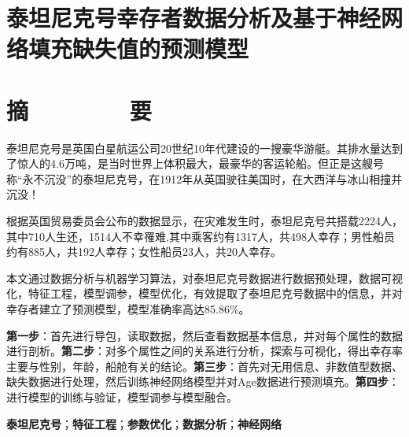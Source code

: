 \section*{\heiti 泰坦尼克号幸存者数据分析及基于神经网络填充缺失值的预测模型}
\section*{\heiti 摘\ \ \ \ \ \ \ \ 要}

泰坦尼克号是英国白星航运公司20世纪10年代建设的一搜豪华游艇。其排水量达到了惊人的4.6万吨，是当时世界上体积最大，最豪华的客运轮船。但正是这艘号称“永不沉没”的泰坦尼克号，在1912年从英国驶往美国时，在大西洋与冰山相撞并沉没！

根据英国贸易委员会公布的数据显示，在灾难发生时，泰坦尼克号共搭载2224人，其中710人生还，1514人不幸罹难,其中乘客约有1317人，共498人幸存；男性船员约有885人，共192人幸存；女性船员23人，共20人幸存。

本文通过数据分析与机器学习算法，对泰坦尼克号数据进行数据预处理，数据可视化，特征工程，模型调参，模型优化，有效提取了泰坦尼克号数据中的信息，并对幸存者建立了预测模型，模型准确率高达85.86\%。

\textbf{第一步}：首先进行导包，读取数据，然后查看数据基本信息，并对每个属性的数据进行剖析。\textbf{第二步}：对多个属性之间的关系进行分析，探索与可视化，得出幸存率主要与性别，年龄，船舱有关的结论。\textbf{第三步}：首先对无用信息、非数值型数据、缺失数据进行处理，然后训练神经网络模型并对Age数据进行预测填充。\textbf{第四步}：进行模型的训练与验证，模型调参与模型融合。
\par
 
 
 \par

\noindent {}\textbf{泰坦尼克号}；\textbf{特征工程}；\textbf{参数优化}；\textbf{数据分析}；\textbf{神经网络}

\clearpage







